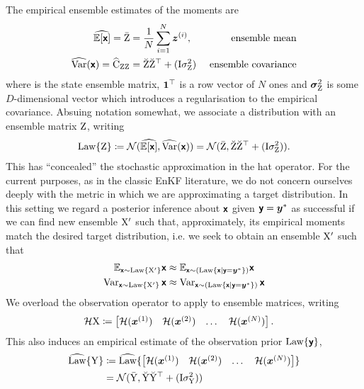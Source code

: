 \documentclass{article}
\begin{document}
The empirical ensemble estimates of the moments are
\begin{align}
    \widehat{\mathbb{E}[\boldsymbol{\mathsf{x}}]}=\bar{\mathrm{Z}} &= \frac{1}{N} \sum_{i=1}^N \boldsymbol{z}^{(i)}, \label{eq:ensemble_mean} & \text{ ensemble mean} \\
    \widehat{\operatorname{Var}}(\boldsymbol{\mathsf{x}}) =\widehat{\mathrm{C}}_{\mathrm{ZZ}} &= \breve{\mathrm{Z}} \breve{\mathrm{Z}}^\top + (\mathrm{I}\sigma^2_{\mathrm{Z}})&\text{ ensemble covariance}  \label{eq:ensemble-covariance}
\end{align}
where is the state ensemble matrix, $\boldsymbol{1}^\top$ is a row vector of $N$ ones and $\boldsymbol{\sigma}_{\mathrm{Z}}^2$ is some $D$-dimensional vector which introduces a regularisation to the empirical covariance.
Absuing notation somewhat, we associate a distribution with an ensemble matrix $\mathrm{Z}$, writing
\begin{align}
\operatorname{Law}\{\mathrm{Z}\} \coloneq \mathcal{N}(\widehat{\mathbb{E}[\boldsymbol{\mathsf{x}}]}, \widehat{\operatorname{Var}}(\boldsymbol{\mathsf{x}})) = \mathcal{N}(\bar{\mathrm{Z}}, \breve{\mathrm{Z}} \breve{\mathrm{Z}}^\top + (\mathrm{I}\sigma^2_{\mathrm{Z}})).
\end{align}
This has ``concealed'' the stochastic approximation in the hat operator. For the current purposes, as in the classic EnKF literature, we do not concern ourselves deeply with the metric in which we are approximating a target distribution.
In this setting we regard a posterior inference about $\boldsymbol{\mathsf{x}}$ given $\boldsymbol{\mathsf{y}}=\boldsymbol{y}^*$ as successful if we can find  new ensemble $\mathrm{X}'$ such that, approximately, its empirical moments match the desired target distribution, i.e. we seek to obtain an ensemble $\mathrm{X}'$ such that
\begin{align}
    \mathbb{E}_{\boldsymbol{\mathsf{x}}\sim \operatorname{Law}\{\mathrm{X}'\}} \boldsymbol{\mathsf{x}} &\approx \mathbb{E}_{\boldsymbol{\mathsf{x}}\sim (\operatorname{Law}\{\boldsymbol{\mathsf{x}} \mid \boldsymbol{\mathsf{y}}=\boldsymbol{y}^*\})} \boldsymbol{\mathsf{x}}\\
    \operatorname{Var}_{\boldsymbol{\mathsf{x}}\sim \operatorname{Law}\{\mathrm{X}'\}} \boldsymbol{\mathsf{x}} &\approx \operatorname{Var}_{\boldsymbol{\mathsf{x}}\sim (\operatorname{Law}\{\boldsymbol{\mathsf{x}} \mid \boldsymbol{\mathsf{y}}=\boldsymbol{y}^*\})} \boldsymbol{\mathsf{x}}
\end{align}
We overload the observation operator to apply to ensemble matrices, writing
\begin{align}
    \mathcal{H}\mathrm{X} &\coloneq \begin{bmatrix}\mathcal{H}(\boldsymbol{x}^{(1)}) & \mathcal{H}(\boldsymbol{x}^{(2)})& \dots& \mathcal{H}(\boldsymbol{x}^{(N)})\end{bmatrix}.
\end{align}
This also induces an empirical estimate of the observation prior $\operatorname{Law}\{\boldsymbol{\mathsf{y}}\}$,
\begin{align}
    \widehat{\operatorname{Law}}\{\mathrm{Y}\} &\coloneq \widehat{\operatorname{Law}}\{\begin{bmatrix}\mathcal{H}(\boldsymbol{x}^{(1)}) & \mathcal{H}(\boldsymbol{x}^{(2)})& \dots& \mathcal{H}(\boldsymbol{x}^{(N)})\end{bmatrix}\}\\
    &= \mathcal{N}(\bar{\mathrm{Y}}, \breve{\mathrm{Y}} \breve{\mathrm{Y}}^\top + (\mathrm{I}\sigma^2_{\mathrm{Y}}))
\end{align}
\end{document}

